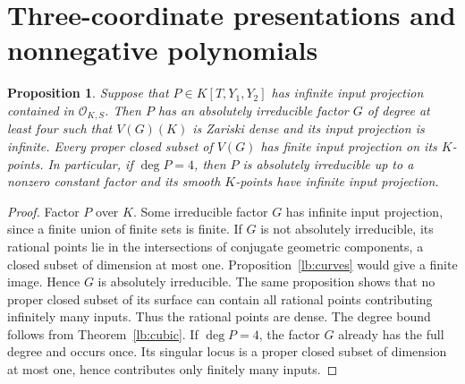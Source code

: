 \documentclass[11pt,a4paper]{article}
\newtheorem{proposition}[theorem]{Proposition}
\theoremstyle{definition}
\newcommand{\OKS}{\mathcal O_{K,S}}
\begin{document}
\section{Three-coordinate presentations and nonnegative polynomials}

\begin{proposition}\label{lb:three-surface}
Suppose that $P\in K[T,Y_1,Y_2]$ has infinite input projection
contained in $\OKS$. Then $P$ has an absolutely irreducible factor
$G$ of degree at least four such that $V(G)(K)$ is Zariski dense
and its input projection is infinite. Every proper closed subset
of $V(G)$ has finite input projection on its $K$-points.
In particular, if $\deg P=4$, then $P$ is absolutely irreducible
up to a nonzero constant factor and its smooth $K$-points have
infinite input projection.
\end{proposition}
\begin{proof}
Factor $P$ over $K$. Some irreducible factor $G$ has infinite
input projection, since a finite union of finite sets is finite.
If $G$ is not absolutely irreducible, its rational points lie
in the intersections of conjugate geometric components, a
closed subset of dimension at most one. Proposition~\ref{lb:curves}
would give a finite image. Hence $G$ is absolutely irreducible.
The same proposition shows that no proper closed subset of its
surface can contain all rational points contributing infinitely
many inputs. Thus the rational points are dense. The degree
bound follows from Theorem~\ref{lb:cubic}. If $\deg P=4$,
the factor $G$ already has the full degree and occurs once.
Its singular locus is a proper closed subset of dimension at
most one, hence contributes only finitely many inputs.
\end{proof}
\end{document}
